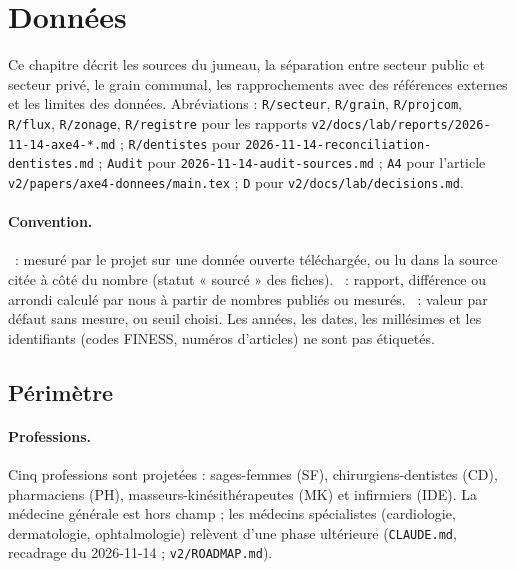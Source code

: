 \providecommand{\donfic}[1]{\nolinkurl{#1}}
\section{Données}\label{don:sec}\label{sec:donnees-ref}
\begingroup\setlength{\emergencystretch}{3em}%

Ce chapitre décrit les sources du jumeau, la séparation entre secteur public et secteur privé, le grain
communal, les rapprochements avec des références externes et les limites des données. Abréviations :
\donfic{R/secteur}, \donfic{R/grain}, \donfic{R/projcom}, \donfic{R/flux}, \donfic{R/zonage},
\donfic{R/registre} pour les rapports \donfic{v2/docs/lab/reports/2026-11-14-axe4-*.md} ;
\donfic{R/dentistes} pour \donfic{2026-11-14-reconciliation-dentistes.md} ; \texttt{Audit} pour
\donfic{2026-11-14-audit-sources.md} ; \texttt{A4} pour l'article \donfic{v2/papers/axe4-donnees/main.tex} ;
\texttt{D} pour \donfic{v2/docs/lab/decisions.md}.

\paragraph{Convention.} \mesure{}~: mesuré par le projet sur une donnée ouverte téléchargée, ou lu dans la
source citée à côté du nombre (statut « sourcé » des fiches). \derive{}~: rapport, différence ou arrondi
calculé par nous à partir de nombres publiés ou mesurés. \suppose{}~: valeur par défaut sans mesure, ou seuil
choisi. Les années, les dates, les millésimes et les identifiants (codes FINESS, numéros d'articles) ne sont pas
étiquetés.

\subsection{Périmètre}\label{don:perimetre}

\paragraph{Professions.} Cinq professions sont projetées : sages-femmes (SF), chirurgiens-dentistes (CD),
pharmaciens (PH), masseurs-kinésithérapeutes (MK) et infirmiers (IDE). La médecine générale est hors champ ;
les médecins spécialistes (cardiologie, dermatologie, ophtalmologie) relèvent d'une phase ultérieure
(\donfic{CLAUDE.md}, recadrage du 2026-11-14 ; \donfic{v2/ROADMAP.md}).


